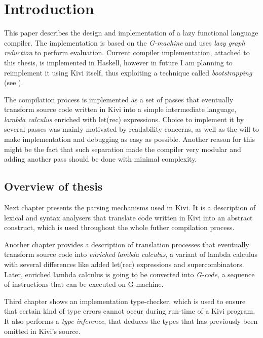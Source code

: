 \documentclass[12pt,a4paper]{report}
\begin{document}
\normalsize

\tableofcontents
\newpage

\chapter{Introduction}

This paper describes the design and implementation of a lazy functional
language compiler. The implementation is based on the
\textit{G-machine}\cite{Jon87} and uses \textit{lazy graph reduction} to
perform evaluation. Current compiler implementation, attached to this thesis,
is implemented in Haskell, however in future I am planning to reimplement it
using Kivi itself, thus exploiting a technique called \textit{bootstrapping}
(see \cite{wiki:bootstrapping}).

The compilation process is implemented as a set of passes that eventually
transform source code written in Kivi into a simple intermediate language,
\textit{lambda calculus} enriched with let(rec) expressions. Choice to
implement it by several passes was mainly motivated by readability concerns, as
well as the will to make implementation and debugging as easy as possible.
Another reason for this might be the fact that such separation made the
compiler very modular and adding another pass should be done with minimal
complexity.

\section{Overview of thesis}
Next chapter presents the parsing mechanisms used in Kivi. It is a description
of lexical and syntax analysers that translate code written in Kivi into an
abstract construct, which is used throughout the whole futher compilation
process.

Another chapter provides a description of translation processes that eventually
transform source code into \textit{enriched lambda calculus}, a variant of
lambda calculus with several differences like added let(rec) expressions and
supercombinators. Later, enriched lambda calculus is going to be converted
into \textit{G-code}, a sequence of instructions that can be executed on
G-machine.

Third chapter shows an implementation type-checker, which is used to ensure
that certain kind of type errors cannot occur during run-time of a Kivi
program. It also performs a \textit{type inference}, that deduces the types
that has previously been omitted in Kivi's source.
\end{document}
